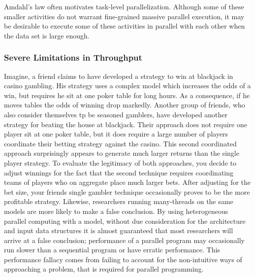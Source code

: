 \documentclass[10pt]{article}[draft]
\begin{document}
\begin{itemize}
		Amdahl's law often motivates task-level parallelization. Although some of these smaller activities do not warrant fine-grained massive parallel execution, it may be desirable to execute some of these activities in parallel with each other when the data set is large enough. 	
		
		\subsubsection*{Severe Limitations in Throughput}
		
		Imagine, a friend claims to have developed a strategy to win at blackjack in casino gambling. His strategy uses a complex model which increases the odds of a win, but requires he sit at one poker table for long hours. As a consequence, if he moves tables the odds of winning drop markedly. Another group of friends, who also consider themselves tp be seasoned gamblers, have developed another strategy for beating the house at blackjack. Their approach does not require one player sit at one poker table, but it does require a large number of players coordinate their betting strategy against the casino. This second coordinated approach surprisingly appears to generate much larger returns than the single player strategy. To evaluate the legitimacy of both approaches, you decide to adjust winnings for the fact that the second technique requires coordinating teams of players who on aggregate place much larger bets. After adjusting for the bet size, your friends single gambler technique occasionally proves to be the more profitable strategy. Likewise, researchers running many-threads on the same models are more likely to make a false conclusion. By using heterogeneous parallel computing  with a model, without due consideration for the architecture and input data structures it is almost guaranteed that most researchers will arrive at a false conclusion; performance of a parallel program may occasionally run slower than a sequential program or have erratic performance. This performance fallacy comes from failing to account for the non-intuitive ways of approaching  a problem, that is required for parallel programming. 
		

\end{itemize}
\end{document}
